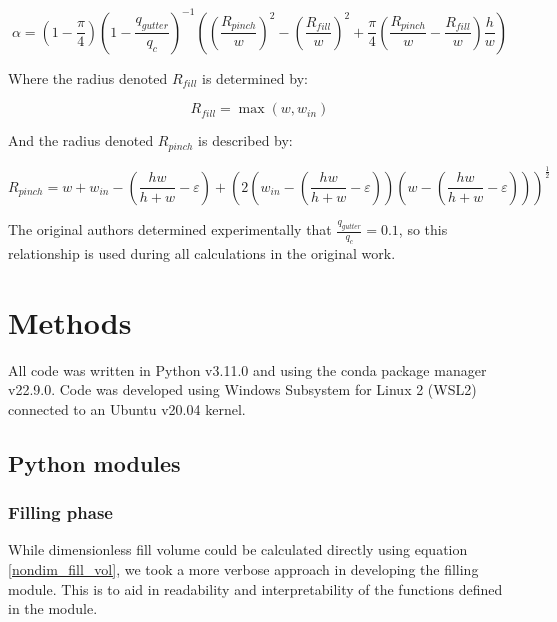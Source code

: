 \begin{equation}
  \alpha = \left(1 - \frac{\pi}{4}\right)
  \left(1 - \frac{q_{gutter}}{q_{c}}\right)^{-1}
  \left(\left(\frac{R_{pinch}}{w}\right)^2 -
  \left(\frac{R_{fill}}{w}\right)^2 +
  \frac{\pi}{4}\left(\frac{R_{pinch}}{w} -
  \frac{R_{fill}}{w}\right)\frac{h}{w}\right)\label{alpha}
\end{equation}

Where the radius denoted $R_{fill}$ is determined by:

\begin{equation}
  R_{fill} = \max\left(w,w_{in}\right)\label{R_fill}
\end{equation}

And the radius denoted $R_{pinch}$ is described by:

\begin{equation}
  R_{pinch} = w + w_{in} - \left(\frac{hw}{h+w} - \varepsilon\right) +
  \left(2\left(w_{in} -
    \left(\frac{hw}{h+w} -
    \varepsilon\right)\right)\left(w -
    \left(\frac{hw}{h+w} - \varepsilon\right)\right)\right)^\frac{1}{2}\label{R_pinch}
\end{equation}


The original authors determined experimentally that $\frac{q_{gutter}}{q_c}=0.1$,
so this relationship is used during all calculations in the original work.

\section{Methods}

All code was written in Python v3.11.0\supercite{pypi_python_nodate} and using the
conda package manager v22.9.0\supercite{noauthor_conda_2017}. Code was developed using
Windows Subsystem for Linux 2 (WSL2)\supercite{microsoft_windows_nodate} connected to an
Ubuntu v20.04\supercite{canonical_ltd_ubuntu_2020} kernel.

\subsection{Python modules}

\subsubsection{Filling phase}

While dimensionless fill volume could be calculated directly using equation \eqref{nondim_fill_vol},
we took a more verbose approach in developing the filling module. This is to aid in readability and
interpretability of the functions defined in the module.

